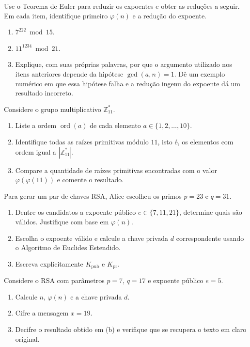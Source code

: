 \documentclass[12pt,a4paper]{article}
\begin{document}
\begin{exercicio}
Use o Teorema de Euler para reduzir os expoentes e obter as redu\c{c}\~{o}es a seguir. Em cada item, identifique primeiro $\varphi(n)$ e a redu\c{c}\~{a}o do expoente.
\begin{enumerate}[label=(\alph*)]
    \item $7^{222} \bmod 15$.
    \item $11^{1234} \bmod 21$.
    \item Explique, com suas pr\'{o}prias palavras, por que o argumento utilizado nos itens anteriores depende da hip\'{o}tese $\gcd(a, n) = 1$. D\^{e} um exemplo num\'{e}rico em que essa hip\'{o}tese falha e a redu\c{c}\~{a}o ingenu do expoente d\'{a} um resultado incorreto.
\end{enumerate}
\end{exercicio}

\begin{exercicio}
Considere o grupo multiplicativo $\mathbb{Z}_{11}^{*}$.
\begin{enumerate}[label=(\alph*)]
    \item Liste a ordem $\operatorname{ord}(a)$ de cada elemento $a \in \{1, 2, \ldots, 10\}$.
    \item Identifique todas as ra\'{i}zes primitivas m\'{o}dulo $11$, isto \'{e}, os elementos com ordem igual a $|\mathbb{Z}_{11}^{*}|$.
    \item Compare a quantidade de ra\'{i}zes primitivas encontradas com o valor $\varphi(\varphi(11))$ e comente o resultado.
\end{enumerate}
\end{exercicio}

\begin{exercicio}
Para gerar um par de chaves RSA, Alice escolheu os primos $p = 23$ e $q = 31$.
\begin{enumerate}[label=(\alph*)]
    \item Dentre os candidatos a expoente p\'{u}blico $e \in \{7, 11, 21\}$, determine quais s\~{a}o v\'{a}lidos. Justifique com base em $\varphi(n)$.
    \item Escolha o expoente v\'{a}lido e calcule a chave privada $d$ correspondente usando o Algoritmo de Euclides Estendido.
    \item Escreva explicitamente $K_{\text{pub}}$ e $K_{\text{pr}}$.
\end{enumerate}
\end{exercicio}

\begin{exercicio}
Considere o RSA com par\^{a}metros $p = 7$, $q = 17$ e expoente p\'{u}blico $e = 5$.
\begin{enumerate}[label=(\alph*)]
    \item Calcule $n$, $\varphi(n)$ e a chave privada $d$.
    \item Cifre a mensagem $x = 19$.
    \item Decifre o resultado obtido em (b) e verifique que se recupera o texto em claro original.
\end{enumerate}
\end{exercicio}
\end{document}
